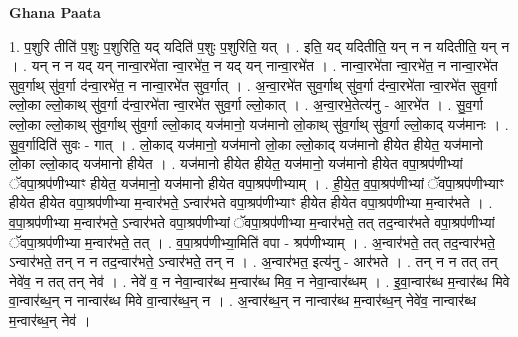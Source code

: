 \documentclass[17pt]{extarticle}
\begin{document}
\textbf{Ghana Paata } \newline

1. प॒शुरि तीति॑ प॒शुः प॒शुरिति॒ यद् यदिति॑ प॒शुः प॒शुरिति॒ यत् । . इति॒ यद् यदितीति॒ यन् न न यदितीति॒ यन् न । . यन् न न यद् यन् नान्वा॒रभे॑ता न्वा॒रभे॑त॒ न यद् यन् नान्वा॒रभे॑त । . नान्वा॒रभे॑ता न्वा॒रभे॑त॒ न नान्वा॒रभे॑त सुव॒र्गाथ् सु॑व॒र्गा द॑न्वा॒रभे॑त॒ न नान्वा॒रभे॑त सुव॒र्गात् । . अ॒न्वा॒रभे॑त सुव॒र्गाथ् सु॑व॒र्गा द॑न्वा॒रभे॑ता न्वा॒रभे॑त सुव॒र्गा ल्लो॒का ल्लो॒काथ् सु॑व॒र्गा द॑न्वा॒रभे॑ता न्वा॒रभे॑त सुव॒र्गा ल्लो॒कात् । . अ॒न्वा॒रभे॒तेत्य॑नु - आ॒रभे॑त । . सु॒व॒र्गा ल्लो॒का ल्लो॒काथ् सु॑व॒र्गाथ् सु॑व॒र्गा ल्लो॒काद् यज॑मानो॒ यज॑मानो लो॒काथ् सु॑व॒र्गाथ् सु॑व॒र्गा ल्लो॒काद् यज॑मानः । . सु॒व॒र्गादिति॑ सुवः - गात् । . लो॒काद् यज॑मानो॒ यज॑मानो लो॒का ल्लो॒काद् यज॑मानो हीयेत हीयेत॒ यज॑मानो लो॒का ल्लो॒काद् यज॑मानो हीयेत । . यज॑मानो हीयेत हीयेत॒ यज॑मानो॒ यज॑मानो हीयेत वपा॒श्रप॑णीभ्यां ॅवपा॒श्रप॑णीभ्याꣳ हीयेत॒ यज॑मानो॒ यज॑मानो हीयेत वपा॒श्रप॑णीभ्याम् । . ही॒ये॒त॒ व॒पा॒श्रप॑णीभ्यां ॅवपा॒श्रप॑णीभ्याꣳ हीयेत हीयेत वपा॒श्रप॑णीभ्या म॒न्वार॑भते॒ ऽन्वार॑भते वपा॒श्रप॑णीभ्याꣳ हीयेत हीयेत वपा॒श्रप॑णीभ्या म॒न्वार॑भते । . व॒पा॒श्रप॑णीभ्या म॒न्वार॑भते॒ ऽन्वार॑भते वपा॒श्रप॑णीभ्यां ॅवपा॒श्रप॑णीभ्या म॒न्वार॑भते॒ तत् तद॒न्वार॑भते वपा॒श्रप॑णीभ्यां ॅवपा॒श्रप॑णीभ्या म॒न्वार॑भते॒ तत् । . व॒पा॒श्रप॑णीभ्या॒मिति॑ वपा - श्रप॑णीभ्याम् । . अ॒न्वार॑भते॒ तत् तद॒न्वार॑भते॒ ऽन्वार॑भते॒ तन् न न तद॒न्वार॑भते॒ ऽन्वार॑भते॒ तन् न । . अ॒न्वार॑भत॒ इत्य॑नु - आर॑भते । . तन् न न तत् तन् नेवे॑व॒ न तत् तन् नेव॑ । . नेवे॑ व॒ न नेवा॒न्वार॑ब्ध म॒न्वार॑ब्ध मिव॒ न नेवा॒न्वार॑ब्धम् । . इ॒वा॒न्वार॑ब्ध म॒न्वार॑ब्ध मिवे वा॒न्वार॑ब्ध॒न् न नान्वार॑ब्ध मिवे वा॒न्वार॑ब्ध॒न् न । . अ॒न्वार॑ब्ध॒न् न नान्वार॑ब्ध म॒न्वार॑ब्ध॒न् नेवे॑व॒ नान्वार॑ब्ध म॒न्वार॑ब्ध॒न् नेव॑ । \newline
\end{document}
